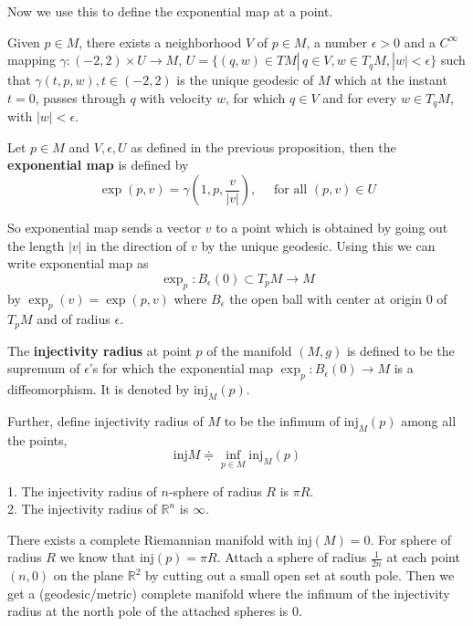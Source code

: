 \documentclass[12pt,a4paper]{article}
\theoremstyle{definition}
\theoremstyle{greenbox}
\newcommand{\R}{\mathbb{R}}
\newcommand{\define}{\doteqdot}
\newcommand{\nj}{\text{inj}}
\begin{document}
    Now we use this to define the exponential map at a point. 
    \begin{proposition}
        Given $ p \in M $, there exists a neighborhood $ V $ of $ p \in M $, a number $ \epsilon >0 $ and a $ C^{\infty} $ mapping $ \gamma :(-2,2) \times U \to M $, $ U = \{(q,w) \in TM |\, q \in V, w \in T_{q}M, |w| < \epsilon\} $ such that $ \gamma(t,p,w) , t \in (-2,2) $ is the unique geodesic of $ M $ which at the instant $ t=0 $, passes through $ q $ with velocity $ w $, for which $ q \in V $ and for every $ w \in T_{q}M $, with $ |w| < \epsilon $. 

    \end{proposition}
    \begin{defn}   
        Let $ p \in M $ and $ V, \epsilon, U $ as defined in the previous proposition, then the \textbf{exponential map} is defined by 
        \[  \exp (p,v) = \gamma\left(1,p, \frac{v}{|v|}\right), \quad \text{ for all }(p,v) \in U\]
         
    \end{defn} 
    So exponential map sends a vector $ v $ to a point  which is obtained by going out the length $ |v| $ in the direction of $ v $ by the unique geodesic. Using this we can write exponential map as 
    \[ \exp_{p} : B_{\epsilon}(0) \subset T_{p}M \to M \]
    by $ \exp_{p}(v) = \exp(p,v) $ where $ B_{\epsilon} $ the open ball with center at origin $ 0 $ of $ T_{p}M $ and of radius $ \epsilon $.     
    \begin{defn}   
        The \textbf{injectivity radius} at point $ p $ of the manifold $ (M,g) $ is defined to be the supremum of $ \epsilon $'s for which the exponential map  $\exp_{p} : B_{\epsilon}(0) \to M$ is a diffeomorphism. It is denoted by $ \text{inj}_{M}(p) $.
    \end{defn} 
    Further, define injectivity radius of $ M $ to be the infimum of $\nj_{M}(p) $ among all the points, 
    \[ \nj M \define \inf_{p \in M} \nj_{M}(p) \]
    \begin{example}
        1. The injectivity radius of $ n $-sphere of radius $ R $ is $ \pi R $. \\
        2. The injectivity radius of $ \R^{n} $ is $ \infty $. 
    \end{example}
    \begin{remark}
        There exists a complete Riemannian manifold with $ \nj(M) = 0 $. For sphere of radius $ R $ we know that $ \nj(p) = \pi R $. Attach a sphere of radius $ \frac{1}{2n} $  at each point $ (n,0) $ on the plane $ \R^{2} $ by cutting out a small open set at south pole. Then we get a (geodesic/metric) complete manifold where the infimum of the injectivity radius at the north pole of the attached spheres is $ 0 $. 
    \end{remark}
\end{document}
